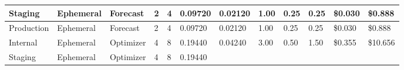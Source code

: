 \begin{landscape}
\begin{table}[!htbp]
\begin{tabular}{llllllllllll}
    \multicolumn{1}{|l|}{\cellcolor[HTML]{FFFF00}Staging} &
      \multicolumn{1}{l|}{\cellcolor[HTML]{99CCFF}Ephemeral} &
      \multicolumn{1}{l|}{\cellcolor[HTML]{D1E977}Forecast} &
      \multicolumn{1}{l|}{\cellcolor[HTML]{BDD881}2} &
      \multicolumn{1}{l|}{\cellcolor[HTML]{BDD881}4} &
      \multicolumn{1}{l|}{\cellcolor[HTML]{FCB47A}0.09720} &
      \multicolumn{1}{l|}{\cellcolor[HTML]{65BE7B}0.02120} &
      \multicolumn{1}{l|}{\cellcolor[HTML]{FFEB84}1.00} &
      \multicolumn{1}{l|}{\cellcolor[HTML]{89C97D}0.25} &
      \multicolumn{1}{l|}{\cellcolor[HTML]{63BE7B}0.25} &
      \multicolumn{1}{l|}{\cellcolor[HTML]{63BE7B}\$0.030} &
      \multicolumn{1}{l|}{\cellcolor[HTML]{63BE7B}\$0.888} \\ \hline
    \multicolumn{1}{|l|}{\cellcolor[HTML]{EFC321}Production} &
      \multicolumn{1}{l|}{\cellcolor[HTML]{99CCFF}Ephemeral} &
      \multicolumn{1}{l|}{\cellcolor[HTML]{D1E977}Forecast} &
      \multicolumn{1}{l|}{\cellcolor[HTML]{BDD881}2} &
      \multicolumn{1}{l|}{\cellcolor[HTML]{BDD881}4} &
      \multicolumn{1}{l|}{\cellcolor[HTML]{FCB47A}0.09720} &
      \multicolumn{1}{l|}{\cellcolor[HTML]{65BE7B}0.02120} &
      \multicolumn{1}{l|}{\cellcolor[HTML]{FFEB84}1.00} &
      \multicolumn{1}{l|}{\cellcolor[HTML]{89C97D}0.25} &
      \multicolumn{1}{l|}{\cellcolor[HTML]{63BE7B}0.25} &
      \multicolumn{1}{l|}{\cellcolor[HTML]{63BE7B}\$0.030} &
      \multicolumn{1}{l|}{\cellcolor[HTML]{63BE7B}\$0.888} \\ \hline
    \multicolumn{1}{|l|}{\cellcolor[HTML]{92D050}Internal} &
      \multicolumn{1}{l|}{\cellcolor[HTML]{99CCFF}Ephemeral} &
      \multicolumn{1}{l|}{\cellcolor[HTML]{B8DD2F}Optimizer} &
      \multicolumn{1}{l|}{\cellcolor[HTML]{63BE7B}4} &
      \multicolumn{1}{l|}{\cellcolor[HTML]{63BE7B}8} &
      \multicolumn{1}{l|}{\cellcolor[HTML]{F8696B}0.19440} &
      \multicolumn{1}{l|}{\cellcolor[HTML]{69BF7B}0.04240} &
      \multicolumn{1}{l|}{\cellcolor[HTML]{FFE082}3.00} &
      \multicolumn{1}{l|}{\cellcolor[HTML]{B0D47F}0.50} &
      \multicolumn{1}{l|}{\cellcolor[HTML]{6BC07B}1.50} &
      \multicolumn{1}{l|}{\cellcolor[HTML]{FFEB84}\$0.355} &
      \multicolumn{1}{l|}{\cellcolor[HTML]{FFEB84}\$10.656} \\ \hline
    \multicolumn{1}{|l|}{\cellcolor[HTML]{FFFF00}Staging} &
      \multicolumn{1}{l|}{\cellcolor[HTML]{99CCFF}Ephemeral} &
      \multicolumn{1}{l|}{\cellcolor[HTML]{B8DD2F}Optimizer} &
      \multicolumn{1}{l|}{\cellcolor[HTML]{63BE7B}4} &
      \multicolumn{1}{l|}{\cellcolor[HTML]{63BE7B}8} &
      \multicolumn{1}{l|}{\cellcolor[HTML]{F8696B}0.19440} &

\end{tabular}
\end{table}
\end{landscape}
